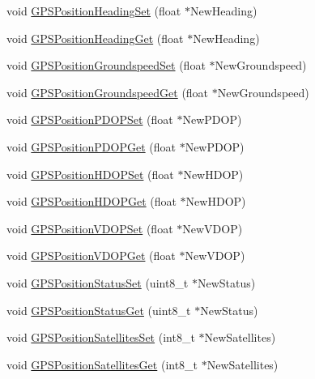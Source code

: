 \begin{DoxyCompactItemize}
void \hyperlink{group___g_p_s_position_ga0e2ebda708da57c212e3525d8053c9d5}{\-G\-P\-S\-Position\-Heading\-Set} (float $\ast$\-New\-Heading)
\item 
void \hyperlink{group___g_p_s_position_ga4753232faa6c3528071938bd97d34015}{\-G\-P\-S\-Position\-Heading\-Get} (float $\ast$\-New\-Heading)
\item 
void \hyperlink{group___g_p_s_position_gaa275f8169602a0b86b7ba599e58d0689}{\-G\-P\-S\-Position\-Groundspeed\-Set} (float $\ast$\-New\-Groundspeed)
\item 
void \hyperlink{group___g_p_s_position_gad0c484dbeb63211fc3146dacac5015a2}{\-G\-P\-S\-Position\-Groundspeed\-Get} (float $\ast$\-New\-Groundspeed)
\item 
void \hyperlink{group___g_p_s_position_gab874eeb481e40e6e3439bc775a7a48f9}{\-G\-P\-S\-Position\-P\-D\-O\-P\-Set} (float $\ast$\-New\-P\-D\-O\-P)
\item 
void \hyperlink{group___g_p_s_position_ga694b4b59e05db02c32d619afe20d9715}{\-G\-P\-S\-Position\-P\-D\-O\-P\-Get} (float $\ast$\-New\-P\-D\-O\-P)
\item 
void \hyperlink{group___g_p_s_position_ga56e06067536cd8b1ac6abb39669ab794}{\-G\-P\-S\-Position\-H\-D\-O\-P\-Set} (float $\ast$\-New\-H\-D\-O\-P)
\item 
void \hyperlink{group___g_p_s_position_ga7e14ef7fac8e8e25ce9b64d62a4b0e55}{\-G\-P\-S\-Position\-H\-D\-O\-P\-Get} (float $\ast$\-New\-H\-D\-O\-P)
\item 
void \hyperlink{group___g_p_s_position_gab6df1cace97e62054634d33214fdceb3}{\-G\-P\-S\-Position\-V\-D\-O\-P\-Set} (float $\ast$\-New\-V\-D\-O\-P)
\item 
void \hyperlink{group___g_p_s_position_gade1706a1d8aa95aff280c0370add6ac8}{\-G\-P\-S\-Position\-V\-D\-O\-P\-Get} (float $\ast$\-New\-V\-D\-O\-P)
\item 
void \hyperlink{group___g_p_s_position_ga96140da598f145678a0c6b8a64769a23}{\-G\-P\-S\-Position\-Status\-Set} (uint8\-\_\-t $\ast$\-New\-Status)
\item 
void \hyperlink{group___g_p_s_position_gaeb42e8dc526e8a4f7930fdc89696c2c1}{\-G\-P\-S\-Position\-Status\-Get} (uint8\-\_\-t $\ast$\-New\-Status)
\item 
void \hyperlink{group___g_p_s_position_ga173197e40403f368b3e215360bb0f635}{\-G\-P\-S\-Position\-Satellites\-Set} (int8\-\_\-t $\ast$\-New\-Satellites)
\item 
void \hyperlink{group___g_p_s_position_ga6f73aeace727833e8291e50b433fbb09}{\-G\-P\-S\-Position\-Satellites\-Get} (int8\-\_\-t $\ast$\-New\-Satellites)
\end{DoxyCompactItemize}


